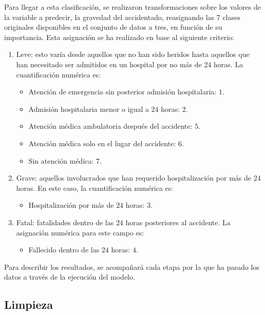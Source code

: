 Para llegar a esta clasificación, se realizaron transformaciones sobre los valores de la variable a predecir, la gravedad del accidentado, reasignando las 7 clases originales disponibles en el conjunto de datos a tres, en función de su importancia. Esta asignación se ha realizado en base al siguiente criterio:

\begin{enumerate}
	\item Leve: esto varía desde aquellos que no han sido heridos hasta aquellos que han necesitado ser admitidos en un hospital por no más de 24 horas. La cuantificación numérica es:
	\begin{itemize}
		\item Atención de emergencia sin posterior admisión hospitalaria: $1$.
		\item Admisión hospitalaria menor o igual a 24 horas: $2$.
		\item Atención médica ambulatoria después del accidente: $5$.
		\item Atención médica solo en el lugar del accidente: $6$.
		\item Sin atención médica: $7$.
	\end{itemize}
	\item Grave: aquellos involucrados que han requerido hospitalización por más de 24 horas. En este caso, la cuantificación numérica es:
	\begin{itemize}
		\item Hospitalización por más de $24$ horas: $3$.
	\end{itemize}
	\item Fatal: fatalidades dentro de las $24$ horas posteriores al accidente. La asignación numérica para este campo es:
	\begin{itemize}
		\item Fallecido dentro de las $24$ horas: $4$.
	\end{itemize}
\end{enumerate}

Para describir los resultados, se acompañará cada etapa por la que ha pasado los datos a través de la ejecución del modelo.

\subsection*{Limpieza}



